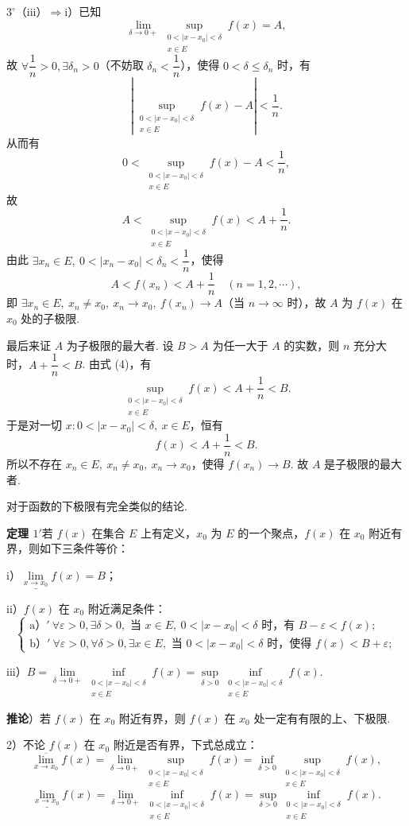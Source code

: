 \documentclass[UTF8,12pt,a4paper,fontset=fandol]{ctexart}
\begin{document}
$3^\circ$（iii）$\Rightarrow$i）已知
\[
  \lim_{\delta\to0+}\sup_{\substack{0<|x-x_0|<\delta\\ x\in E}}f(x)=A,
\]
故 $\forall \dfrac1n>0,\exists \delta_n>0$（不妨取 $\delta_n<\dfrac1n$），使得 $0<\delta\le\delta_n$ 时，有
\[
  \left|\sup_{\substack{0<|x-x_0|<\delta\\ x\in E}}f(x)-A\right|<\frac1n.
\]
从而有
\[
  0<\sup_{\substack{0<|x-x_0|<\delta\\ x\in E}}f(x)-A<\frac1n,
\]
故
\[
  A<\sup_{\substack{0<|x-x_0|<\delta\\ x\in E}}f(x)<A+\frac1n.
\tag{4}
\]
由此 $\exists x_n\in E,\ 0<|x_n-x_0|<\delta_n<\dfrac1n$，使得
\[
  A<f(x_n)<A+\frac1n\quad(n=1,2,\cdots),
\]
即 $\exists x_n\in E,\ x_n\ne x_0,\ x_n\to x_0,\ f(x_n)\to A$（当 $n\to\infty$ 时），故 $A$ 为 $f(x)$ 在 $x_0$ 处的子极限.

最后来证 $A$ 为子极限的最大者. 设 $B>A$ 为任一大于 $A$ 的实数，则 $n$ 充分大时，$A+\dfrac1n<B$. 由式 (4)，有
\[
  \sup_{\substack{0<|x-x_0|<\delta\\ x\in E}}f(x)<A+\frac1n<B.
\]
于是对一切 $x:0<|x-x_0|<\delta,\ x\in E$，恒有
\[
  f(x)<A+\frac1n<B.
\]
所以不存在 $x_n\in E,\ x_n\ne x_0,\ x_n\to x_0$，使得 $f(x_n)\to B$. 故 $A$ 是子极限的最大者.

对于函数的下极限有完全类似的结论.

\noindent\textbf{定理 $1'$}\quad 若 $f(x)$ 在集合 $E$ 上有定义，$x_0$ 为 $E$ 的一个聚点，$f(x)$ 在 $x_0$ 附近有界，则如下三条件等价：

i）$\underline{\lim\limits_{x\to x_0}}f(x)=B$；

ii）$f(x)$ 在 $x_0$ 附近满足条件：
\[
\begin{cases}
\text{a）}'\ \forall \varepsilon>0,\exists\delta>0,\text{ 当 }x\in E,\ 0<|x-x_0|<\delta\text{ 时，有 }B-\varepsilon<f(x);\\
\text{b）}'\ \forall \varepsilon>0,\forall\delta>0,\exists x\in E,\text{ 当 }0<|x-x_0|<\delta\text{ 时，使得 }f(x)<B+\varepsilon;
\end{cases}
\]

iii）$B=\lim\limits_{\delta\to0+}\inf\limits_{\substack{0<|x-x_0|<\delta\\ x\in E}}f(x)
=\sup\limits_{\delta>0}\inf\limits_{\substack{0<|x-x_0|<\delta\\ x\in E}}f(x)$.

\noindent\textbf{推论}）若 $f(x)$ 在 $x_0$ 附近有界，则 $f(x)$ 在 $x_0$ 处一定有有限的上、下极限.

2）不论 $f(x)$ 在 $x_0$ 附近是否有界，下式总成立：
\[
  \overline{\lim_{x\to x_0}}f(x)
  =\lim_{\delta\to0+}\sup_{\substack{0<|x-x_0|<\delta\\ x\in E}}f(x)
  =\inf_{\delta>0}\sup_{\substack{0<|x-x_0|<\delta\\ x\in E}}f(x),
\]
\[
  \underline{\lim_{x\to x_0}}f(x)
  =\lim_{\delta\to0+}\inf_{\substack{0<|x-x_0|<\delta\\ x\in E}}f(x)
  =\sup_{\delta>0}\inf_{\substack{0<|x-x_0|<\delta\\ x\in E}}f(x).
\]
\end{document}

